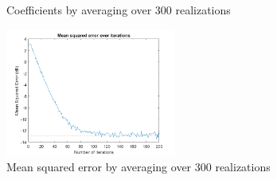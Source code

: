\documentclass[a4paper, 12pt]{report}
\begin{document}
\begin{figure}[h!]
	\centering
	\caption{Coefficients by averaging over 300 realizations}
	\label{fig:coeff300}
\end{figure}

\begin{figure}[h!]
	\centering
	\includegraphics[width=0.5\textwidth]{error_300real}
	\caption{Mean squared error by averaging over 300 realizations}
	\label{fig:err300}
\end{figure}
\end{document}
